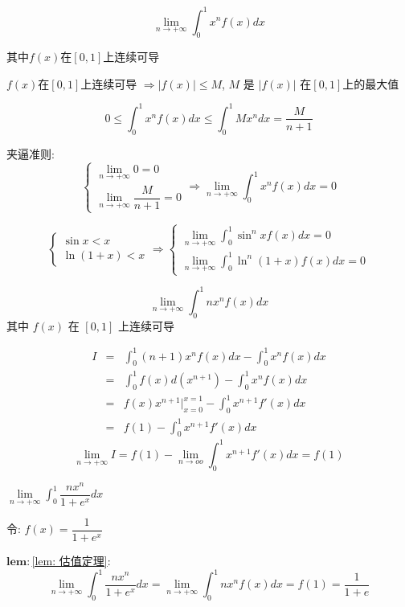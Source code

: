\begin{lemma}[估值定理]\label{lem: 估值定理}
	
	$$\lim\limits_{n\rightarrow +\infty}\int_{0}^{1}x^nf(x)dx$$
	
	其中$f(x)$在$[0,1]$上连续可导
	

	$f(x)$在$[0,1]$上连续可导 $\Rightarrow |f(x)|\leq M$, $M$ 是 $|f(x)|$ 在$[0,1]$上的最大值

	$$0\leq\int_{0}^{1}x^nf(x)dx\leq\int_{0}^{1}Mx^ndx = \dfrac{M}{n+1}$$
	
	夹逼准则:
	$$\begin{cases}
	  \lim\limits_{n \to +\infty} 0 = 0\\
	  \lim\limits_{n \to +\infty}\dfrac{M}{n+1} = 0
	\end{cases}\Rightarrow \lim\limits_{n \to +\infty}\int_{0}^{1}x^nf(x)dx=0$$ 
	
	$$\begin{cases}
	  \sin x < x\\
	  \ln(1+x) < x
	\end{cases}\Rightarrow
	\begin{cases}
	  \lim\limits_{n \to +\infty}\int_{0}^{1}\sin ^{n}xf(x)dx=0 \\
	  \lim\limits_{n \to +\infty}\int_{0}^{1}\ln^{n}(1+x)f(x)dx=0 
	\end{cases}$$

	$$\lim\limits_{n\rightarrow +\infty}\int_{0}^{1}nx^nf(x)dx$$
	 其中 $f(x)$ 在 $[0,1]$ 上连续可导

	\begin{eqnarray*}
		I & = & \int_{0}^{1}(n+1)x^{n}f(x)dx - \int_{0}^{1}x^nf(x)dx\\
		  & = & \int_{0}^{1}f(x)d(x^{n+1}) - \int_{0}^{1}x^nf(x)dx\\
		  & = & f(x)x^{n+1}\big|_{x=0}^{x=1} - \int_{0}^{1}x^{n+1}f'(x)dx\\
		  & = & f(1) - \int_{0}^{1}x^{n+1}f'(x)dx
	\end{eqnarray*}
	$$\lim\limits_{n \to +\infty}I = f(1) - \lim\limits_{n \to oo}\int_{0}^{1}x^{n+1}f'(x)dx = f(1)$$
\end{lemma}

\begin{example}[][Exam: 29.3.13]
	$\lim\limits_{n\rightarrow +\infty}\int_{0}^{1}\dfrac{nx^n}{1+e^x}dx$
\end{example}

\begin{solution}
	
	令: $f(x)=\dfrac{1}{1+e^x}$
	
	$\mathbf{lem: }$\ref{lem: 估值定理}: 
	$$\lim\limits_{n\rightarrow +\infty}\int_{0}^{1}\dfrac{nx^n}{1+e^x}dx = \lim\limits_{n\rightarrow +\infty}\int_{0}^{1}nx^{n}f(x)dx = 
	 f(1) = \dfrac{1}{1+e}$$
\end{solution}


